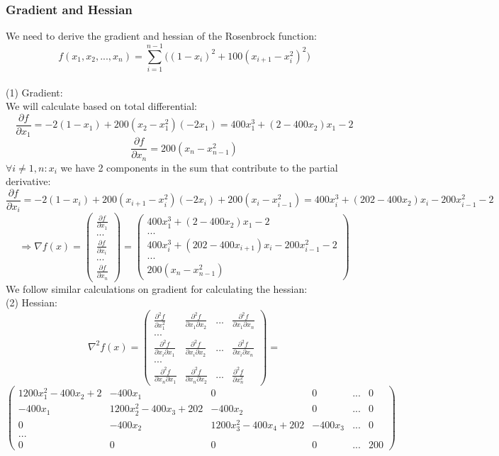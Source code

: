 \documentclass{article}
\begin{document}
\subsubsection{Gradient and Hessian}
We need to derive the gradient and hessian of the Rosenbrock function:
$$f(x_1,x_2,...,x_n) = \sum_{i=1}^{n-1}\big((1-x_i)^2 + 100(x_{i+1} - x_i^2)^2\big) $$
\\
(1) Gradient:\\
We will calculate based on total differential:\\
$$\frac{\partial f}{\partial x_1} = -2(1-x_1) + 200(x_2-x_1^2)(-2x_1)=400x_1^3+(2-400x_2)x_1-2$$
$$\frac{\partial f}{\partial x_n} = 200(x_n-x_{n-1}^2)$$
$\forall i \neq 1,n : x_i$ we have 2 components in the sum that contribute to the partial derivative:\\
$$\frac{\partial f}{\partial x_i} = -2(1-x_i) + 200(x_{i+1}-x_i^2)(-2x_i) + 200(x_i-x_{i-1}^2)=400x_i^3+(202-400x_2)x_i - 200x_{i-1}^2 -2$$
$$\Rightarrow \nabla f(x) = 
\begin{pmatrix}
    \frac{\partial f}{\partial x_1} \\
    ...\\
    \frac{\partial f}{\partial x_i}\\
    ...\\
    \frac{\partial f}{\partial x_n}
\end{pmatrix} =
\begin{pmatrix}
    400x_1^3+(2-400x_2)x_1-2 \\
    ...\\
    400x_i^3+(202-400x_{i+1})x_i - 200x_{i-1}^2 -2\\
    ...\\
    200(x_n-x_{n-1}^2)
\end{pmatrix}
$$
\newpage
We follow similar calculations on gradient for calculating the hessian:\\
(2) Hessian:\\
$$\nabla^2 f(x) = 
\begin{pmatrix}
    \frac{\partial^2 f}{\partial x_1^2} & \frac{\partial^2 f}{\partial x_1 \partial x_2} & ... & \frac{\partial^2 f}{\partial x_1 \partial x_n}\\
    ...\\
    \frac{\partial^2 f}{\partial x_i\partial x_1} & \frac{\partial^2 f}{\partial x_i \partial x_2} & ... & \frac{\partial^2 f}{\partial x_i \partial x_n}\\
    ...\\
    \frac{\partial^2 f}{\partial x_n \partial x_1} & \frac{\partial^2 f}{\partial x_n \partial x_2} & ... & \frac{\partial^2 f}{\partial x_n^2}
\end{pmatrix} =$$
$$
\begin{pmatrix}
    1200x_1^2-400x_2+2 & -400x_1              & 0 & 0 &... & 0 \\
    -400x_1            & 1200x_2^2-400x_3+202 & -400x_2 & 0 & ... & 0 \\
    0                  & -400x_2        & 1200x_3^2-400x_4+202 & -400x_3 &  ... & 0 \\
    ...\\
    0                  & 0                    & 0     & 0 &  ... & 200
\end{pmatrix}
$$
\end{document}
